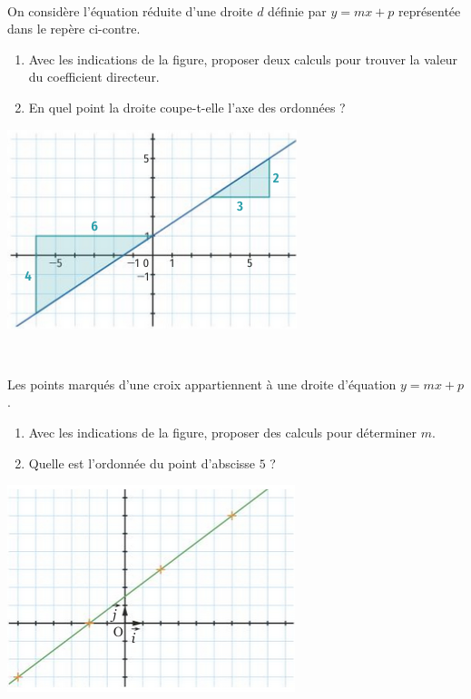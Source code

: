 \documentclass[11pt]{article}
\begin{document}
\begin{exo}~\\
  \begin{minipage}[]{.5\textwidth}
    On considère l'équation réduite d'une droite $d$ définie par $y=mx+p$
    représentée dans le repère ci-contre.
    \begin{enumerate}
      \item Avec les indications de la figure, proposer deux calculs pour
        trouver la valeur du coefficient directeur.
      \item En quel point la droite coupe-t-elle l'axe des ordonnées ?
    \end{enumerate}
  \end{minipage}
  \begin{minipage}[]{.5\textwidth}
    \begin{center}
      \includegraphics[scale=.7]{exo1.png}
    \end{center}
  \end{minipage}
\end{exo}

\begin{exo}~\\
  \begin{minipage}[]{.5\textwidth}
    Les points marqués d'une croix appartiennent à une droite d'équation $y =
    mx+p$.
    \begin{enumerate}
      \item Avec les indications de la figure, proposer des calculs pour
        déterminer $m$.
      \item Quelle est l'ordonnée du point d'abscisse $5$ ?
    \end{enumerate}
  \end{minipage}
  \begin{minipage}[]{.5\textwidth}
    \begin{center}
      \includegraphics[scale=.7]{exo2.png}
    \end{center}
  \end{minipage}
\end{exo}
\end{document}
